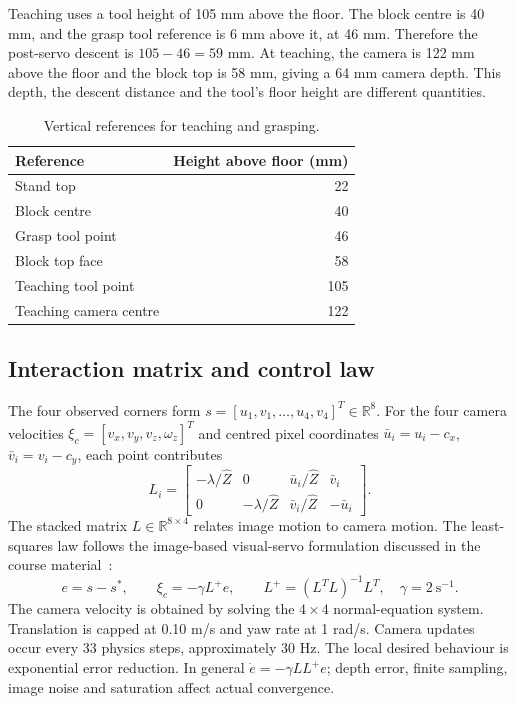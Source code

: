 \documentclass[11pt,a4paper]{article}
\newcommand{\R}{\mathbb{R}}
\begin{document}
Teaching uses a tool height of 105 mm above the floor. The block centre is
40 mm, and the grasp tool reference is 6 mm above it, at 46 mm. Therefore
the post-servo descent is $105-46=59$ mm. At teaching, the camera is 122 mm
above the floor and the block top is 58 mm, giving a 64 mm camera depth.
This depth, the descent distance and the tool's floor height are different
quantities.

\begin{table}[htbp]\centering
\caption{Vertical references for teaching and grasping.}\label{tab:heights}
\begin{tabular}{@{}lr@{}}\toprule
Reference & Height above floor (mm)\\\midrule
Stand top & 22\\Block centre & 40\\Grasp tool point & 46\\
Block top face & 58\\Teaching tool point & 105\\Teaching camera centre & 122\\
\bottomrule\end{tabular}\end{table}

\subsection{Interaction matrix and control law}
The four observed corners form
$s=[u_1,v_1,\ldots,u_4,v_4]^T\in\R^8$. For the four camera velocities
$\xi_c=[v_x,v_y,v_z,\omega_z]^T$ and centred pixel coordinates
$\bar u_i=u_i-c_x$, $\bar v_i=v_i-c_y$, each point contributes
\begin{equation}
 L_i=\begin{bmatrix}
 -\lambda/\hat Z&0&\bar u_i/\hat Z&\bar v_i\\
 0&-\lambda/\hat Z&\bar v_i/\hat Z&-\bar u_i
 \end{bmatrix}.
\end{equation}
The stacked matrix $L\in\R^{8\times4}$ relates image motion to camera
motion. The least-squares law follows the image-based visual-servo
formulation discussed in the course material~\cite{course}:
\begin{equation}
 e=s-s^*,\qquad \xi_c=-\gamma L^+e,\qquad
 L^+=(L^TL)^{-1}L^T,\quad\gamma=2\ \mathrm{s}^{-1}.
\end{equation}
The camera velocity is obtained by solving the $4\times4$ normal-equation system. Translation is capped
at 0.10 m/s and yaw rate at 1 rad/s. Camera updates occur every 33 physics
steps, approximately 30 Hz. The local desired behaviour is exponential
error reduction. In general $\dot e=-\gamma LL^+e$; depth error, finite
sampling, image noise and saturation affect actual convergence.
\end{document}
